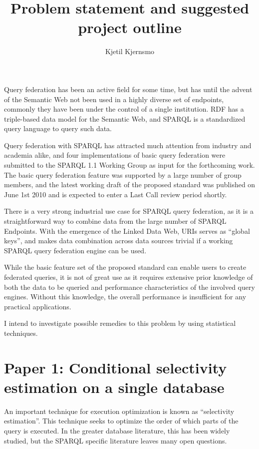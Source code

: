 \documentclass[a4paper,english,10pt]{article}
\title{Problem statement and suggested project outline}
\author{Kjetil Kjernsmo}
\begin{document}
\maketitle


Query federation has been an active field for some time, but has until
the advent of the Semantic Web not been used in a highly diverse set
of endpoints, commonly they have been under the control of a single
institution. RDF has a triple-based data model for the Semantic Web,
and SPARQL is a standardized query language to query such data.

Query federation with SPARQL has attracted much attention
from industry and academia alike, and four implementations of basic
query federation were submitted to the SPARQL 1.1 Working Group as
input for the forthcoming work. The basic query federation feature was
supported by a large number of group members, and the latest working
draft of the proposed standard was published on June 1st 2010 and is
expected to enter a Last Call review period shortly.

There is a very strong industrial use case for SPARQL query
federation, as it is a straightforward way to combine data from the
large number of SPARQL Endpoints. With the emergence of the Linked
Data Web, URIs serves as ``global keys'', and makes data combination
across data sources trivial if a working SPARQL query federation
engine can be used.

While the basic feature set of the proposed standard can enable users
to create federated queries, it is not of great use as it requires
extensive prior knowledge of both the data to be queried and
performance characteristics of the involved query engines. Without
this knowledge, the overall performance is insufficient for any
practical applications.

I intend to investigate possible remedies to this problem by using
statistical techniques. 

\section*{Paper 1: Conditional selectivity estimation on a single database}


An important technique for execution optimization is known as
``selectivity estimation''. This technique seeks to optimize the order
of which parts of the query is executed. In the greater database
literature, this has been widely studied, but the SPARQL specific
literature leaves many open questions.
\end{document}

